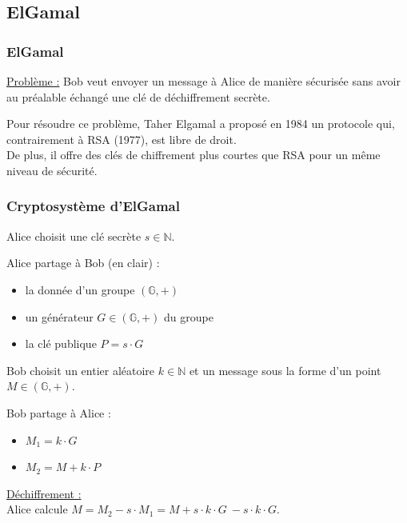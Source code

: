 \documentclass[
	11pt, %
]{beamer}
\begin{document}
\subsection{ElGamal}

\begin{frame}
\frametitle{ElGamal}

	\underline{Problème :} 
	Bob veut envoyer un message à Alice de manière sécurisée sans avoir au préalable échangé une clé de déchiffrement secrète.

	\bigskip

	Pour résoudre ce problème, Taher Elgamal a proposé en 1984 un protocole qui, contrairement à RSA (1977), est libre de droit.\\
	De plus, il offre des clés de chiffrement plus courtes que RSA pour un même niveau de sécurité.

\end{frame}



\begin{frame}
	\frametitle{Cryptosystème d'ElGamal}
	
	Alice choisit une clé secrète \(s \in \mathbb{N}\).

	Alice partage à Bob (en clair) :
	\begin{itemize}
		\item la donnée d'un groupe \((\mathbb{G},+)\)
		\item un générateur \(G \in \mathbb{(\mathbb{G},+)}\) du groupe
		\item la clé publique \(P = s \cdot G\)
	\end{itemize}

	\bigskip

	Bob choisit un entier aléatoire \(k \in \mathbb{N}\) et un message sous la forme d'un point \(M \in \mathbb{(\mathbb{G},+)}\).

	Bob partage à Alice :
	\begin{itemize}
		\item \(M_1 = k \cdot G\)
		\item \(M_2 = M + k \cdot P\)
	\end{itemize}

	\bigskip

	\underline{Déchiffrement :} \\
	Alice calcule $M = M_2 - s \cdot M_1 = M + s \cdot k \cdot G\ - s \cdot k \cdot G$.
\end{frame}
\end{document}
